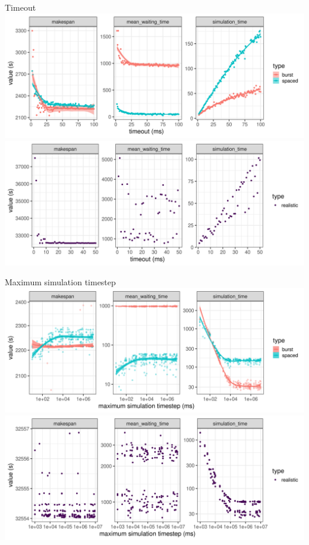 \documentclass[12pt, aspectratio=43]{beamer}
\begin{document}
\begin{frame}[allowframebreaks]{Timeout}
	\centering
	\includegraphics[width=\textwidth]{../imgs/timeout_burst_spaced.png}
	\includegraphics[width=\textwidth]{../imgs/timeout_realistic.png}
\end{frame}

\begin{frame}[allowframebreaks]{Maximum simulation timestep}
	\centering
	\includegraphics[width=\textwidth]{../imgs/max-timestep_burst_sp.png}
	\includegraphics[width=\textwidth]{../imgs/max-timestep_realistic.png}
\end{frame}
\end{document}

